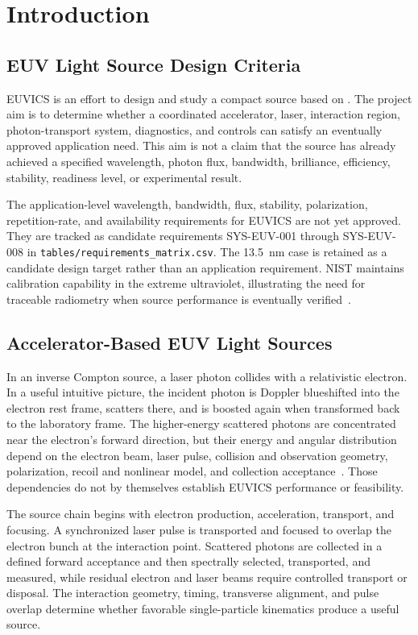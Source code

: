 \section{Introduction}

\subsection{EUV Light Source Design Criteria}

EUVICS is an effort to design and study a compact \EUV{} source based on
\ICS{}. The project aim is to determine whether a coordinated accelerator,
laser, interaction region, photon-transport system, diagnostics, and controls
can satisfy an eventually approved application need. This aim is not a claim
that the source has already achieved a specified wavelength, photon flux,
bandwidth, brilliance, efficiency, stability, readiness level, or experimental
result.

The application-level wavelength, bandwidth, flux, stability, polarization,
repetition-rate, and availability requirements for EUVICS are not yet approved.
They are tracked as candidate requirements SYS-EUV-001 through SYS-EUV-008 in
\texttt{tables/requirements\_matrix.csv}. The 13.5~nm case is retained as a
candidate design target rather than an application requirement. NIST maintains
calibration capability in the extreme ultraviolet, illustrating the need for
traceable radiometry when source performance is eventually
verified~\cite{NISTEUVDetectorCalibration}.

\subsection{Accelerator-Based EUV Light Sources}

In an inverse Compton source, a laser photon collides with a relativistic
electron. In a useful intuitive picture, the incident photon is Doppler
blueshifted into the electron rest frame, scatters there, and is boosted again
when transformed back to the laboratory frame. The higher-energy scattered
photons are concentrated near the electron's forward direction, but their
energy and angular distribution depend on the electron beam, laser pulse,
collision and observation geometry, polarization, recoil and nonlinear model,
and collection acceptance~\cite{SunWu2011ComptonSource}. Those dependencies do
not by themselves establish EUVICS performance or feasibility.

The source chain begins with electron production, acceleration, transport, and
focusing. A synchronized laser pulse is transported and focused to overlap the
electron bunch at the interaction point. Scattered photons are collected in a
defined forward acceptance and then spectrally selected, transported, and
measured, while residual electron and laser beams require controlled transport
or disposal. The interaction geometry, timing, transverse alignment, and pulse
overlap determine whether favorable single-particle kinematics produce a useful
source.

